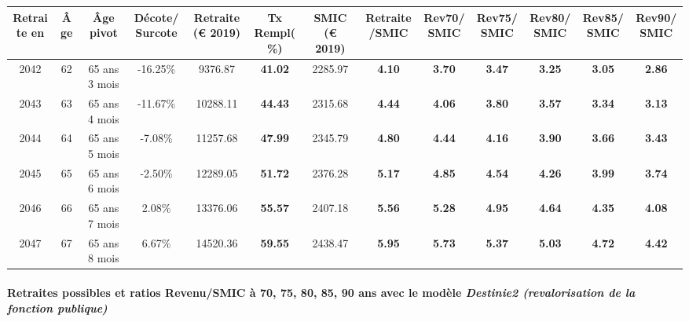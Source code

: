 { \scriptsize \begin{center} 
\begin{tabular}[htb]{|c|c||c|c||c|c||c||c|c|c|c|c|c|} 
\hline 
 Retraite en &  Âge &  Âge pivot &  Décote/Surcote &  Retraite (\euro{} 2019) &  Tx Rempl(\%) &  SMIC (\euro{} 2019) &  Retraite/SMIC &  Rev70/SMIC &  Rev75/SMIC &  Rev80/SMIC &  Rev85/SMIC &  Rev90/SMIC \\ 
\hline \hline 
 2042 &  62 &  65 ans 3 mois &  -16.25\% &  9376.87 &  {\bf 41.02} &  2285.97 &  {\bf 4.10} &  {\bf 3.70} &  {\bf 3.47} &  {\bf 3.25} &  {\bf 3.05} &  {\bf 2.86} \\ 
\hline 
 2043 &  63 &  65 ans 4 mois &  -11.67\% &  10288.11 &  {\bf 44.43} &  2315.68 &  {\bf 4.44} &  {\bf 4.06} &  {\bf 3.80} &  {\bf 3.57} &  {\bf 3.34} &  {\bf 3.13} \\ 
\hline 
 2044 &  64 &  65 ans 5 mois &  -7.08\% &  11257.68 &  {\bf 47.99} &  2345.79 &  {\bf 4.80} &  {\bf 4.44} &  {\bf 4.16} &  {\bf 3.90} &  {\bf 3.66} &  {\bf 3.43} \\ 
\hline 
 2045 &  65 &  65 ans 6 mois &  -2.50\% &  12289.05 &  {\bf 51.72} &  2376.28 &  {\bf 5.17} &  {\bf 4.85} &  {\bf 4.54} &  {\bf 4.26} &  {\bf 3.99} &  {\bf 3.74} \\ 
\hline 
 2046 &  66 &  65 ans 7 mois &  2.08\% &  13376.06 &  {\bf 55.57} &  2407.18 &  {\bf 5.56} &  {\bf 5.28} &  {\bf 4.95} &  {\bf 4.64} &  {\bf 4.35} &  {\bf 4.08} \\ 
\hline 
 2047 &  67 &  65 ans 8 mois &  6.67\% &  14520.36 &  {\bf 59.55} &  2438.47 &  {\bf 5.95} &  {\bf 5.73} &  {\bf 5.37} &  {\bf 5.03} &  {\bf 4.72} &  {\bf 4.42} \\ 
\hline 
\hline 
\end{tabular} 
\end{center} } 
\paragraph{Retraites possibles et ratios Revenu/SMIC à 70, 75, 80, 85, 90 ans avec le modèle \emph{Destinie2 (revalorisation de la fonction publique)}}  
 
